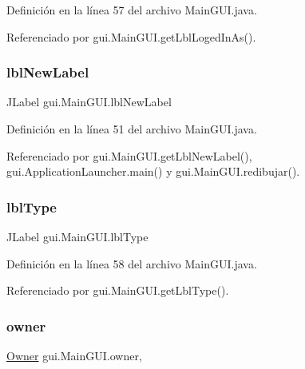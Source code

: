 Definición en la línea 57 del archivo Main\+G\+U\+I.\+java.



Referenciado por gui.\+Main\+G\+U\+I.\+get\+Lbl\+Loged\+In\+As().

\mbox{\label{classgui_1_1_main_g_u_i_a0fc72962f06022026150f3d01638f929}} 
\subsubsection{\texorpdfstring{lblNewLabel}{lblNewLabel}}
{\footnotesize\ttfamily J\+Label gui.\+Main\+G\+U\+I.\+lbl\+New\+Label\hspace{0.3cm}{\ttfamily [protected]}}



Definición en la línea 51 del archivo Main\+G\+U\+I.\+java.



Referenciado por gui.\+Main\+G\+U\+I.\+get\+Lbl\+New\+Label(), gui.\+Application\+Launcher.\+main() y gui.\+Main\+G\+U\+I.\+redibujar().

\mbox{\label{classgui_1_1_main_g_u_i_a765a67a47cfcc50fd64e1ce0c2571c0d}} 
\subsubsection{\texorpdfstring{lblType}{lblType}}
{\footnotesize\ttfamily J\+Label gui.\+Main\+G\+U\+I.\+lbl\+Type}



Definición en la línea 58 del archivo Main\+G\+U\+I.\+java.



Referenciado por gui.\+Main\+G\+U\+I.\+get\+Lbl\+Type().

\mbox{\label{classgui_1_1_main_g_u_i_af293b8b4096d52f9b4747f898f5599b3}} 
\subsubsection{\texorpdfstring{owner}{owner}}
{\footnotesize\ttfamily \mbox{\hyperlink{classdomain_1_1_owner}{Owner}} gui.\+Main\+G\+U\+I.\+owner\hspace{0.3cm}{\ttfamily [static]}, {\ttfamily [protected]}}



